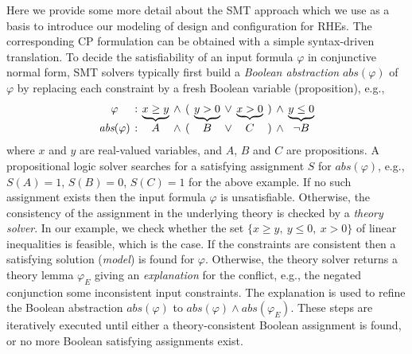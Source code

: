 Here we provide some more detail about the SMT approach which we use
as a basis to introduce our modeling of design and configuration for
RHEs. The corresponding CP formulation can be obtained with a simple
syntax-driven translation. To decide the satisfiability of an input
formula $\varphi$ in conjunctive normal form, SMT solvers typically
first build a \emph{Boolean  abstraction} $\textit{abs}(\varphi)$ of
$\varphi$ by replacing each constraint by a fresh Boolean variable
(proposition), e.g., 
\begin{eqnarray*}
	\arraycolsep=2pt
	\begin{array}{ccccccccccc}
		\varphi &: &\underbrace{x \geq y} &\wedge &(&\underbrace{y > 0}& \vee &\underbrace{x >0}&)& \wedge &\underbrace{y \leq 0} \\
		\textit{abs}(\varphi)&:&A& \wedge& (&B& \vee &C&)& \wedge  &\neg B
	\end{array}
	\label{eq:abs}
\end{eqnarray*}
where $x$ and $y$ are real-valued variables, and $A$, $B$ and $C$ are
propositions. A propositional logic solver searches for a satisfying
assignment $S$ for $\textit{abs}(\varphi)$, e.g., $S(A)=1$, $S(B)=0$, 
$S(C)=1$ for the above example.  If no such assignment exists then the
input formula $\varphi$ is unsatisfiable. Otherwise, the consistency
of the assignment in the underlying theory is checked by a
\emph{theory solver}. In our example, we check whether the set $\{ x
\geq y,\ y \leq 0,\ x > 0\}$ of linear inequalities is feasible, which
is the case. If the constraints are consistent then a satisfying
solution (\textit{model}) is found for $\varphi$. Otherwise, the
theory solver returns a theory lemma $\varphi_E$ giving an
\textit{explanation} for the conflict, e.g., the negated conjunction
some inconsistent input constraints. 
The explanation is used to refine the Boolean abstraction
$\textit{abs}(\varphi)$ to $\textit{abs}(\varphi)\wedge
\textit{abs}(\varphi_E)$. These steps are iteratively executed until
either a theory-consistent Boolean assignment is found, or no more
Boolean satisfying assignments exist.


